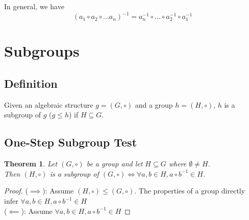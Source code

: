 \documentclass[a4paper]{article}
\begin{document}
In general, we have
\[
    (a_1 \circ a_2 \circ \dots a_n)^{-1}
    = a_n^{-1} \circ \dots \circ a_2^{-1} \circ a_1^{-1}
\]

\section{Subgroups}

\subsection{Definition}

Given an algebraic structure \(g=(G, \circ)\) and a group \(h=(H, \circ)\), \(h\)
is a subgroup of \(g\) (\(g \leq h\)) if \(H \subseteq G\).

\subsection{One-Step Subgroup Test}

\newtheorem*{theorem1}{Theorem}

\begin{theorem1}
    Let \((G, \circ)\) be a group and let \(H \subseteq G\) where \(\emptyset \neq H\).\\
    Then \((H, \circ)\) is a subgroup of \((G, \circ) \iff
    \forall a,b \in H, a \circ b^{-1} \in H\).
\end{theorem1}
\begin{proof}
    (\(\implies\)): Assume \((H, \circ) \leq (G, \circ)\).
    The properties of a group directly infer \(\forall a,b \in H, a \circ b^{-1} \in H\) \\
    (\(\impliedby\)): Assume \(\forall a,b \in H, a \circ b^{-1} \in H\)
\end{proof}
\end{document}
